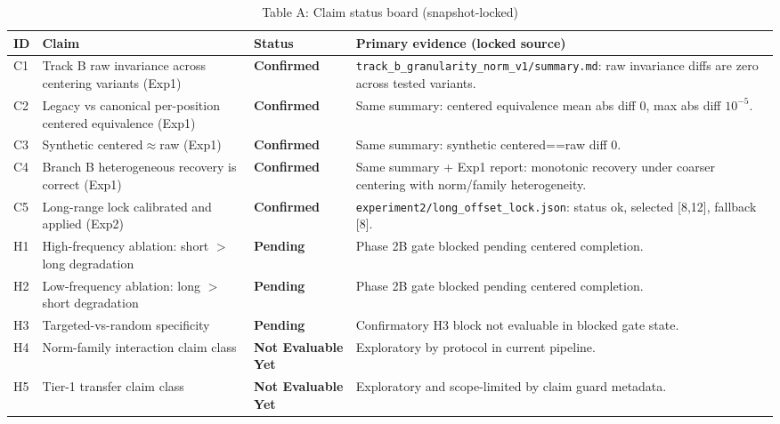 \documentclass[11pt]{article}
\theoremstyle{definition}
\begin{document}
\begin{table}[ht]
\centering
\caption{Table A: Claim status board (snapshot-locked)}
\small
\begin{tabularx}{\textwidth}{>{\raggedright\arraybackslash}p{}>{\raggedright\arraybackslash}p{}>{\raggedright\arraybackslash}p{}X}
\toprule
\textbf{ID} & \textbf{Claim} & \textbf{Status} & \textbf{Primary evidence (locked source)} \\
\midrule
C1 & Track B raw invariance across centering variants (Exp1) & \textbf{Confirmed} & \texttt{track\_b\_granularity\_norm\_v1/summary.md}: raw invariance diffs are zero across tested variants. \\
C2 & Legacy vs canonical per-position centered equivalence (Exp1) & \textbf{Confirmed} & Same summary: centered equivalence mean abs diff 0, max abs diff $10^{-5}$. \\
C3 & Synthetic centered$\approx$raw (Exp1) & \textbf{Confirmed} & Same summary: synthetic centered==raw diff 0. \\
C4 & Branch B heterogeneous recovery is correct (Exp1) & \textbf{Confirmed} & Same summary + Exp1 report: monotonic recovery under coarser centering with norm/family heterogeneity. \\
C5 & Long-range lock calibrated and applied (Exp2) & \textbf{Confirmed} & \texttt{experiment2/long\_offset\_lock.json}: status ok, selected [8,12], fallback [8]. \\
H1 & High-frequency ablation: short $>$ long degradation & \textbf{Pending} & Phase 2B gate blocked pending centered completion. \\
H2 & Low-frequency ablation: long $>$ short degradation & \textbf{Pending} & Phase 2B gate blocked pending centered completion. \\
H3 & Targeted-vs-random specificity & \textbf{Pending} & Confirmatory H3 block not evaluable in blocked gate state. \\
H4 & Norm-family interaction claim class & \textbf{Not Evaluable Yet} & Exploratory by protocol in current pipeline. \\
H5 & Tier-1 transfer claim class & \textbf{Not Evaluable Yet} & Exploratory and scope-limited by claim guard metadata. \\
\bottomrule
\end{tabularx}
\end{table}
\end{document}
